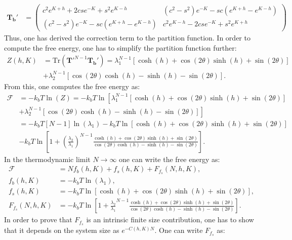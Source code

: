 \documentclass[a4paper]{article}
\newcommand{\trace}{\text{Tr}}
\begin{document}
\begin{align*}
    \mathbf{T_b}' &= \begin{pmatrix}
        c^2e^{K + h} + 2cse^{-K} + s^2e^{K - h} & (c^2 - s^2)e^{-K} - sc\left(e^{K + h} - e^{K - h}\right)\\
        (c^2 - s^2)e^{-K} - sc\left(e^{K + h} - e^{K - h}\right) & c^2e^{K - h} - 2cse^{-K} + s^2e^{K + h}
    \end{pmatrix}
\end{align*}Thus, one has derived the correction term to the partition function. In order to compute the free energy, one has to simplify the partition function further:
\begin{align*}
    Z(h, K) &= \trace\left(\mathbf{T}'^{N-1}\mathbf{T_b}'\right) = \lambda_1^{N-1}\left[\cosh(h) +\cos(2\theta)\sinh(h) + \sin(2\theta)\right]\\
    & + \lambda_2^{N - 1}\left[\cos(2\theta)\cosh(h) - \sinh(h) - \sin(2\theta)\right].
\end{align*}From this, one computes the free energy as:
\begin{align*}
    \mathcal{F} &= -k_bT\ln(Z) = -k_bT\ln\left[\lambda_1^{N-1}\left[\cosh(h) +\cos(2\theta)\sinh(h) + \sin(2\theta)\right]\right.\\
    &\left. + \lambda_2^{N - 1}\left[\cos(2\theta)\cosh(h) - \sinh(h) - \sin(2\theta)\right]\right]\\
    &= -k_bT\left[N - 1\right]\ln(\lambda_1) - k_bT\ln\left[\cosh(h) +\cos(2\theta)\sinh(h) + \sin(2\theta)\right]\\
    & - k_bT\ln\left[1 + \left(\frac{\lambda_2}{\lambda_1}\right)^{N-1}\frac{\cosh(h) +\cos(2\theta)\sinh(h) + \sin(2\theta)}{\cos(2\theta)\cosh(h) - \sinh(h) - \sin(2\theta)}\right].
\end{align*}In the thermodynamic limit $N\to\infty$ one can write the free energy as:
\begin{align*}
    \mathcal{F} &= Nf_b(h, K) + f_s(h, K) + F_{f_s}(N, h, K),\\
    f_b(h, K) &= -k_bT\ln(\lambda_1),\\
    f_s(h, K) &= -k_bT\ln\left[\cosh(h) +\cos(2\theta)\sinh(h) + \sin(2\theta)\right],\\
    F_{f_s}(N, h, K) &= -k_bT\ln\left[1 + \frac{\lambda_2}{\lambda_1}^{N-1}\frac{\cosh(h) +\cos(2\theta)\sinh(h) + \sin(2\theta)}{\cos(2\theta)\cosh(h) - \sinh(h) - \sin(2\theta)}\right].
\end{align*}In order to prove that $F_{f_s}$ is an intrinsic finite size contribution, one has to show that it depends on the system size as $e^{-C(h, K)N}$. One can write $F_{f_s}$ as:
\end{document}
